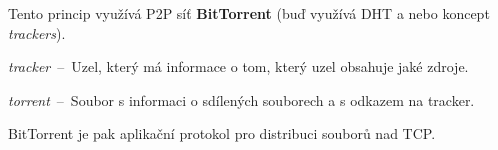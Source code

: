 \begin{compactitem}
    \item Tento princip využívá P2P síť \textbf{BitTorrent} (buď využívá DHT a nebo koncept \textit{trackers}). \begin{compactitem}
        \item \textit{tracker}~--~Uzel, který má informace o tom, který uzel obsahuje jaké zdroje.
        \item \textit{torrent}~--~Soubor s informaci o sdílených souborech a s odkazem na tracker.
        \item BitTorrent je pak aplikační protokol pro distribuci souborů nad TCP.
    \end{compactitem}
\end{compactitem}
